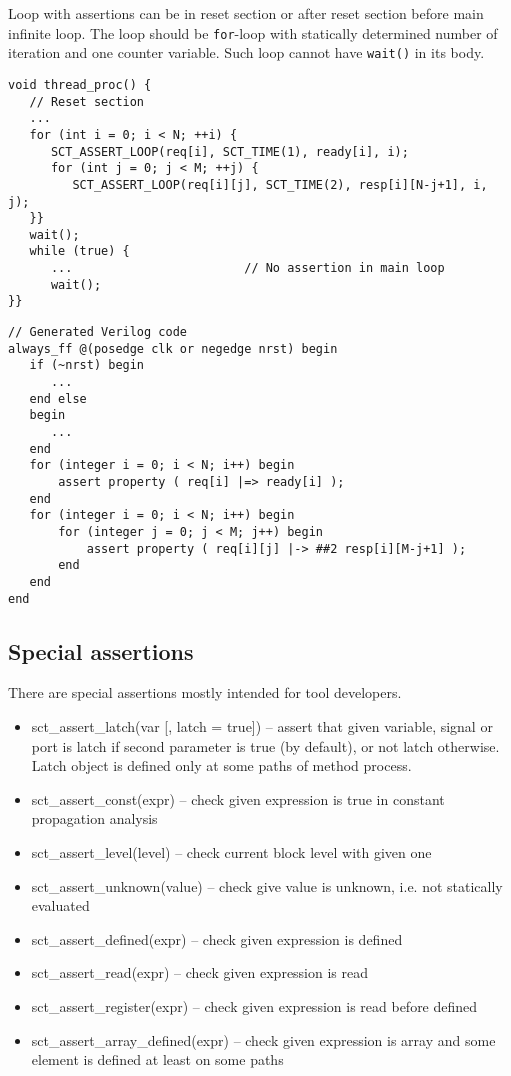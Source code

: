 Loop with assertions can be in reset section or after reset section before main infinite loop. The loop should be {\tt for}-loop with statically determined number of iteration and one counter variable. Such loop cannot have {\tt wait()} in its body. 

\begin{lstlisting}[style=mycpp]
void thread_proc() {
   // Reset section
   ...
   for (int i = 0; i < N; ++i) {
      SCT_ASSERT_LOOP(req[i], SCT_TIME(1), ready[i], i);
      for (int j = 0; j < M; ++j) {
         SCT_ASSERT_LOOP(req[i][j], SCT_TIME(2), resp[i][N-j+1], i, j);
   }}
   wait();                        
   while (true) { 
      ...                        // No assertion in main loop 
      wait();
}}
\end{lstlisting}
%
\begin{lstlisting}[style=myverilog]
// Generated Verilog code
always_ff @(posedge clk or negedge nrst) begin
   if (~nrst) begin
      ...
   end else 
   begin 
      ... 
   end 
   for (integer i = 0; i < N; i++) begin
       assert property ( req[i] |=> ready[i] );  
   end 
   for (integer i = 0; i < N; i++) begin
       for (integer j = 0; j < M; j++) begin
           assert property ( req[i][j] |-> ##2 resp[i][M-j+1] );  
       end
   end 
end
\end{lstlisting}

\subsection{Special assertions}\label{section:assert_special}

There are special assertions mostly intended for tool developers.
\begin{itemize}
\item sct\_assert\_latch(var [, latch = true]) -- assert that given variable, signal or port is latch if second parameter is true (by default), or not latch otherwise. Latch object is defined only at some paths of method process.
\item sct\_assert\_const(expr) -- check given expression is true in constant propagation analysis
\item sct\_assert\_level(level) -- check current block level with given one
\item sct\_assert\_unknown(value) -- check give value is unknown, i.e. not statically evaluated
\item sct\_assert\_defined(expr) -- check given expression  is defined 
\item sct\_assert\_read(expr) -- check given expression is read 
\item sct\_assert\_register(expr) -- check given expression is read before defined 
\item sct\_assert\_array\_defined(expr) -- check given expression is array and some element is defined at least on some paths
\end{itemize}


